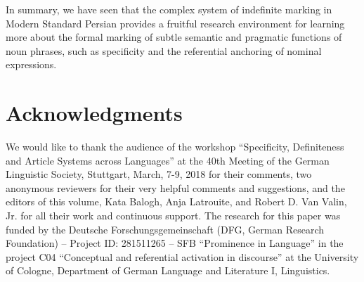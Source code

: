 \documentclass[output=paper]{langsci/langscibook}
\begin{document}
{
In summary, we have seen that the complex system of indefinite marking in Modern Standard Persian provides a fruitful research environment for learning more about the formal marking of subtle semantic and pragmatic functions of noun phrases, such as specificity and the referential anchoring of nominal expressions.
}

\largerpage
\section*{Acknowledgments}
We would like to thank the audience of the workshop ``Specificity, Definiteness and Article Systems across Languages'' at the 40th Meeting of the German Linguistic Society, Stuttgart, March, 7-9, 2018 for their comments, two anonymous reviewers for their very helpful comments and suggestions, and the editors of this volume, Kata Balogh, Anja Latrouite, and Robert D. Van Valin, Jr. for all their work and continuous support. The research for this paper was funded by the Deutsche Forschungsgemeinschaft (DFG, German Research Foundation) -- Project ID: 281511265 -- SFB ``Prominence in Language'' in the project C04 ``Conceptual and referential activation in discourse'' at the University of Cologne, Department of German Language and Literature I, Linguistics.

{\sloppy\printbibliography[heading=subbibliography,notkeyword=this]}
\end{document}
